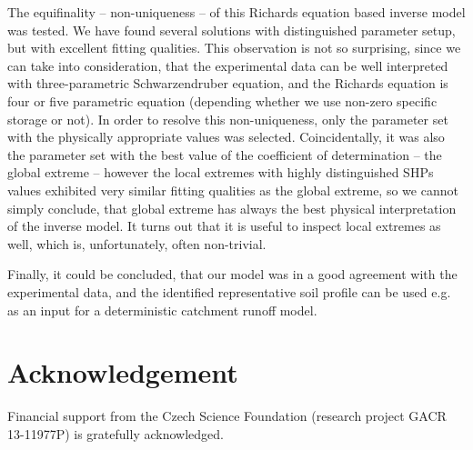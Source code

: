 \documentclass[review]{myarticle}
\begin{document}
The equifinality -- non-uniqueness --  of this Richards equation based inverse model was tested. We have found several solutions with distinguished parameter setup, but with excellent fitting qualities. This observation is not so surprising,  since we can take into consideration, that the experimental data can be well interpreted with three-parametric Schwarzendruber equation, and the Richards equation is four or five parametric equation (depending whether we use non-zero specific storage or not). In order to resolve this non-uniqueness, only the parameter set with the physically appropriate values was selected. Coincidentally, it was also the parameter set with the best value of the coefficient of determination -- the global extreme -- however the local extremes with highly distinguished SHPs values exhibited very similar fitting qualities as the global extreme, so we cannot simply conclude, that global extreme has always the best physical interpretation of the inverse model. It turns out that it is useful to inspect local extremes as well, which is, unfortunately,  often non-trivial.



% 

Finally, it could be concluded, that our model was in a good agreement with the experimental data, and the identified representative soil profile can be used e.g. as an input for a deterministic catchment runoff model.

\section{Acknowledgement}

Financial support from the Czech Science Foundation (research project GACR 13-11977P) is gratefully acknowledged.



\end{document}
